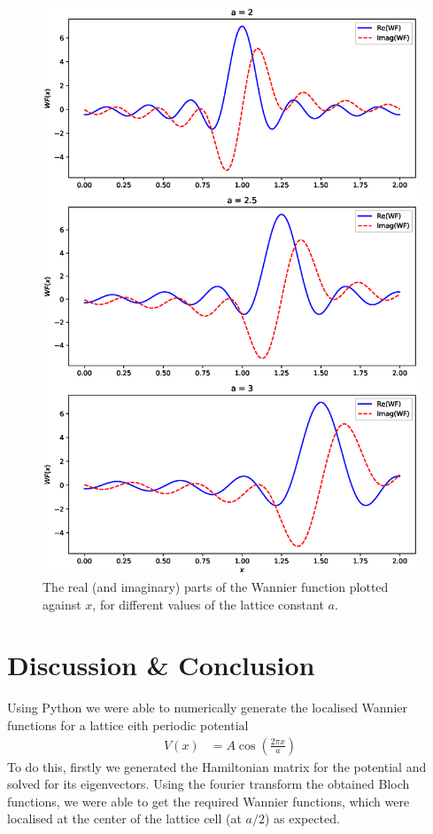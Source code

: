 \documentclass[12pt,a4paper]{article}
\begin{document}
\begin{figure}[H]
    \centering
    \includegraphics[width=0.9\linewidth]{images/wannier1.eps}
    \caption{The real (and imaginary) parts of the Wannier function plotted against $x$, for different values of the lattice constant $a$.}
\end{figure}

\section{Discussion \& Conclusion}
Using Python we were able to numerically generate the localised Wannier functions for a lattice eith periodic potential
\begin{align*}
    V(x) &= A\cos\left(\frac{2\pi x}{a}\right)
\end{align*}
To do this, firstly we generated the Hamiltonian matrix for the potential and solved for its eigenvectors. Using the fourier transform the obtained Bloch functions, we were able to get the required Wannier functions, which were localised at the center of the lattice cell (at $a/2$) as expected.
\end{document}
